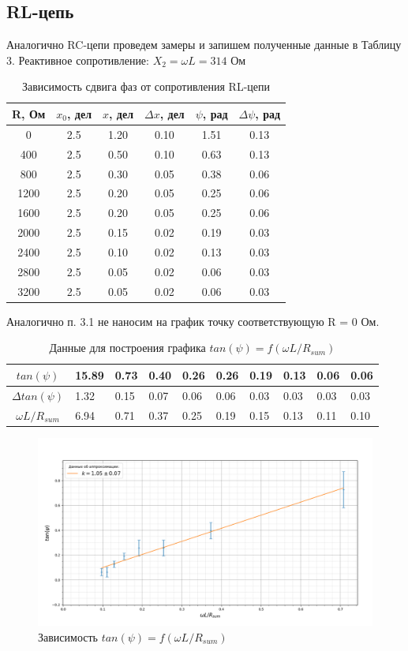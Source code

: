 \documentclass[a4paper, 12pt]{article}%
\begin{document}
	\subsection{RL-цепь}
	Аналогично RC-цепи проведем замеры и запишем полученные данные в Таблицу 3. Реактивное сопротивление: $X_2 = \omega L = 314$ Ом
	\begin{table}[H]
		\centering
		\begin{tabular}{|c|c|c|c|c|c|}
			\hline
		R, Ом & $x_0$, дел & $x$, дел   & $\Delta x$, дел   & $\psi$, рад  & $\Delta \psi$, рад \\ \hline
			0     & 2.5 & 1.20 & 0.10 & 1.51 & 0.13 \\ \hline
			400   & 2.5 & 0.50 & 0.10 & 0.63 & 0.13 \\ \hline
			800   & 2.5 & 0.30 & 0.05 & 0.38 & 0.06 \\ \hline
			1200  & 2.5 & 0.20 & 0.05 & 0.25 & 0.06 \\ \hline
			1600  & 2.5 & 0.20 & 0.05 & 0.25 & 0.06 \\ \hline
			2000  & 2.5 & 0.15 & 0.02 & 0.19 & 0.03 \\ \hline
			2400  & 2.5 & 0.10 & 0.02 & 0.13 & 0.03 \\ \hline
			2800  & 2.5 & 0.05 & 0.02 & 0.06 & 0.03 \\ \hline
			3200  & 2.5 & 0.05 & 0.02 & 0.06 & 0.03 \\ \hline
		\end{tabular}
		\caption{Зависимость сдвига фаз от сопротивления RL-цепи}
	\end{table}
	Аналогично п. 3.1 не наносим на график точку соответствующую R = 0 Ом.
	\begin{table}[H]
		\centering
		\begin{tabular}{|c|l|l|l|l|l|l|l|l|l|}
			\hline
			$tan(\psi)$  & 15.89 & 0.73 & 0.40 & 0.26 & 0.26 & 0.19 & 0.13 & 0.06 & 0.06 \\ \hline
			$\Delta tan(\psi)$ & 1.32  & 0.15 & 0.07 & 0.06 & 0.06 & 0.03 & 0.03 & 0.03 & 0.03 \\ \hline
			$\omega L / R_{sum}$ & 6.94  & 0.71 & 0.37 & 0.25 & 0.19 & 0.15 & 0.13 & 0.11 & 0.10 \\ \hline
		\end{tabular}
		\caption{Данные для построения графика $tan(\psi) = f(\omega L / R_{sum})$}
	\end{table}
	
	\begin{figure}[H]
		\centering
		\includegraphics[width=0.9\linewidth]{RL}
		\caption{Зависимость $tan(\psi) = f(\omega L / R_{sum})$}
		\label{fig:rl}
	\end{figure}
\end{document}

